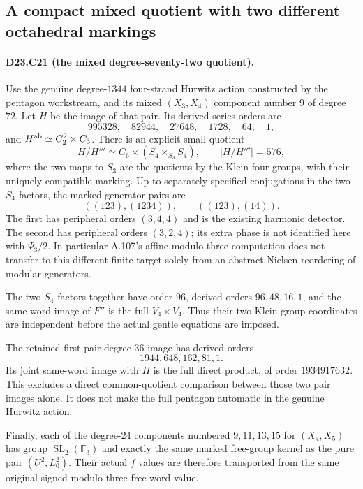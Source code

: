 \subsection{A compact mixed quotient with two different octahedral markings}

\paragraph{D23.C21 (the mixed degree-seventy-two quotient).}
Use the genuine degree-$1344$ four-strand Hurwitz action constructed
by the pentagon workstream, and its mixed $(X_3,X_4)$ component
number $9$ of degree $72$. Let $H$ be the image of that pair.
Its derived-series orders are
\[
 995328,\quad82944,\quad27648,\quad1728,\quad64,\quad1,
\]
and $H^{\rm ab}\simeq C_2^2\times C_3$.
There is an explicit small quotient
\[
 H/H'''\simeq C_6\times(S_4\times_{S_3}S_4),
 \qquad |H/H'''|=576,
\tag{D23.C21.1}
\]
where the two maps to $S_3$ are the quotients by the Klein
four-groups, with their uniquely compatible marking.
Up to separately specified conjugations in the two $S_4$ factors,
the marked generator pairs are
\[
 ((123),(1234)),\qquad ((123),(14)).
\tag{D23.C21.2}
\]
The first has peripheral orders $(3,4,4)$ and is the existing
harmonic detector. The second has peripheral orders $(3,2,4)$;
its extra phase is not identified here with $\Psi_3/2$.
In particular A.107's affine modulo-three computation does
not transfer to this different finite target solely from an
abstract Nielsen reordering of modular generators.

The two $S_4$ factors together have order $96$, derived orders
$96,48,16,1$, and the same-word image of $F''$ is the full
$V_4\times V_4$. Thus their two Klein-group coordinates are
independent before the actual gentle equations are imposed.

The retained first-pair degree-$36$ image has derived orders
\[
                       1944,648,162,81,1.
\]
Its joint same-word image with $H$ is the full direct product,
of order $1934917632$. This excludes a direct common-quotient
comparison between those two pair images alone. It does not
make the full pentagon automatic in the genuine Hurwitz action.

Finally, each of the degree-$24$ components numbered
$9,11,13,15$ for $(X_4,X_5)$ has group
$\operatorname{SL}_2(\mathbb F_3)$ and exactly the same marked
free-group kernel as the pure pair $(U^2,L_0^2)$.
Their actual $f$ values are therefore transported from the
same original signed modulo-three free-word value.

